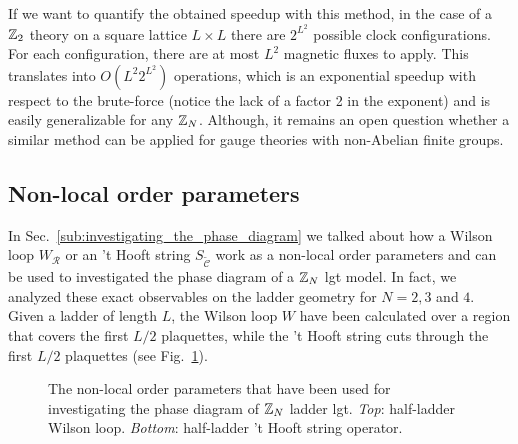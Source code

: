 If we want to quantify the obtained speedup with this method, in the case of a $\mathbb{Z}_2$ theory on a square lattice $L \times L$ there are $2^{L^2}$ possible clock configurations.
For each configuration, there are at most $L^2$ magnetic fluxes to apply.
This translates into $O(L^2 2^{L^2})$ operations, which is an exponential speedup with respect to the brute-force (notice the lack of a factor 2 in the exponent) and is easily generalizable for any $\mathbb{Z}_N$.
Although, it remains an open question whether a similar method can be applied for gauge theories with non-Abelian finite groups.



\subsection{Non-local order parameters}%
\label{sub:non_local_order_parameters}

In Sec.~\ref{sub:investigating_the_phase_diagram} we talked about how a Wilson loop $W_{\mathcal{R}}$ or an 't Hooft string $S_{\tilde{\mathcal{C}}}$ work as a non-local order parameters and can be used to investigated the phase diagram of a $\mathbb{Z}_N$ \ac{lgt} model.
In fact, we analyzed these exact observables on the ladder geometry for $N = 2,3$ and $4$.
Given a ladder of length $L$, the Wilson loop $W$ have been calculated over a region that covers the first $L/2$ plaquettes, while the 't Hooft string cuts through the first $L/2$ plaquettes (see Fig.~\ref{fig:nlop_ladder}).

\begin{figure}[h]
    \centering
    
    \caption[Non-local order parameters on the ladder]{The non-local order parameters that have been used for investigating the phase diagram of $\mathbb{Z}_N$ ladder \ac{lgt}.
    \emph{Top}: half-ladder Wilson loop.
    \emph{Bottom}: half-ladder 't Hooft string operator.}%
    \label{fig:nlop_ladder}
\end{figure}
